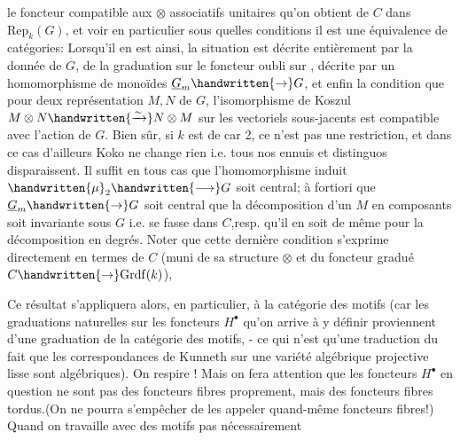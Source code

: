 le foncteur compatible aux $\otimes$ associatifs unitaires qu'on obtient de $C$ dans $\mathrm{Rep}_k(G)$, et voir en particulier sous quelles conditions il est une équivalence de catégories:  Lorsqu'il en est ainsi, la situation est décrite entièrement par la donnée de $G$, de la graduation sur  le foncteur oubli sur , décrite par un homomorphisme de monoïdes $\underline{G}_m\handwritten{\to}G$, et enfin la condition que pour deux représentation $M,N$ de $G$, l'isomorphisme de Koszul $M\otimes N\handwritten{\xrightarrow{\sim}}N\otimes M$ sur les vectoriels sous-jacents est compatible avec l'action de $G$. Bien sûr, si $k$ est de car 2, ce n'est pas une restriction, et dans ce cas d'ailleurs Koko ne change rien i.e. tous nos ennuis et distinguos disparaissent.  Il suffit en tous cas que l'homomorphisme induit $\handwritten{\mu}_2\handwritten{\longrightarrow}G$ soit central; à fortiori que $\underline{G}_m\handwritten{\to}G$ soit central que la décomposition d'un $M$ en composants  soit invariante sous $G$ i.e. se fasse dans $C$,resp. qu'il en soit de même pour la décomposition en degrés. Noter que cette dernière condition s'exprime directement en termes de $C$ (muni de sa structure $\otimes$ et du foncteur  gradué $C\handwritten{\to}\mathrm{Grdf}(k)$), 

 Ce résultat s'appliquera alors, en particulier, à la catégorie des motifs (car les  graduations naturelles sur les foncteurs $H^\bullet$ qu'on arrive à y définir  proviennent d'une graduation de la catégorie des motifs, - ce qui n'est qu'une traduction du fait que les correspondances de Kunneth sur une variété algébrique projective lisse sont algébriques). On respire ! Mais on fera attention que les foncteurs $H^\bullet$ en question ne sont pas des foncteurs fibres proprement, mais des foncteurs fibres tordus.(On ne pourra s'empêcher de les appeler quand-même foncteurs fibres!) Quand on travaille avec des motifs pas nécessairement
